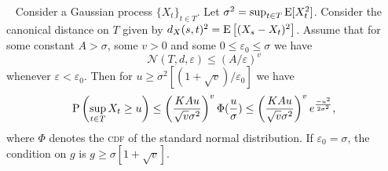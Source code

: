 %
%
\begin{theorem}
    ~\label{thm:talagrand}
    \cite[Thm. 2.4]{talagrand1994sharper}
    Consider a Gaussian process \( \{ X_{t} \}_{t \in T} \). Let \( \sigma^2 = \sup_{t \in T} \operatorname*{E}[X_{t}^2] \).
    Consider the canonical distance on $T$ given by \( d_{X}(s,t)^2 = \operatorname*{E}\left[(X_{s}-X_{t})^2\right]\).
    Assume that for some constant \( A > \sigma \), some \( v > 0 \) and some \( 0 \leq \varepsilon_{0} \leq \sigma \) we have 
    \[
        \mathcal{N}(T,d,\varepsilon) \leq (A/\varepsilon)^{v}
    \]
    whenever \( \varepsilon < \varepsilon_{0} \).
    Then for \( u \geq \sigma^2[(1+\sqrt{v})/\varepsilon_{0}] \) we have
    \[
        \mathrm{P} \left( \sup_{t \in T} X_{t} \geq u \right) \leq \left( \frac{K A u}{\sqrt{v} \sigma^2} \right)^{v} \Phi(\frac{u}{\sigma})
        \leq  \left(\frac{K A u}{\sqrt{v} \sigma^2} \right)^{v} e^{\frac{-u^2}{2\sigma^2}},
    \]
    where $\Phi$ denotes the \textsc{cdf} of the standard normal distribution. If \( \varepsilon_{0} = \sigma \), the condition on $g$ is \( g \geq \sigma[1+\sqrt{v}] \).
     
\end{theorem}